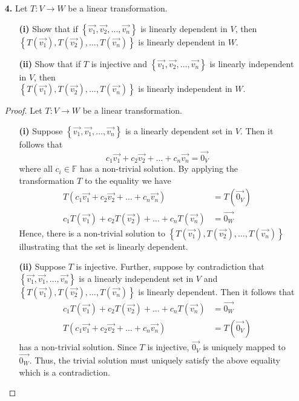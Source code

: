 \documentclass[ 12pt ]{article}
\begin{document}
\begin{enumerate}
	\item[\textbf{4.}] Let $T : V \to W$ be a linear transformation.
		\begin{enumerate}
			\item[\textbf{(i)}] Show that if $\left \{ \vec{v_1}, \vec{v_2}, \hdots, \vec{v_n} \right \}$ is linearly dependent in $V$, then $\left \{ T \left ( \vec{v_1} \right ),
				T \left ( \vec{v_2} \right ), \hdots, T \left ( \vec{v_n} \right ) \right \}$ is linearly dependent in $W$.
			\item[\textbf{(ii)}] Show that if $T$ is injective and $\left \{ \vec{v_1}, \vec{v_2}, \hdots, \vec{v_n} \right \}$ is linearly independent in $V$, then \\
				$\left \{ T \left ( \vec{v_1} \right ), T \left ( \vec{v_2} \right ), \hdots, T \left ( \vec{v_n} \right ) \right \}$ is linearly independent in $W$.
		\end{enumerate}

		\begin{proof}
			Let $T : V \to W$ be a linear transformation.
			\begin{enumerate}
				\item[\textbf{(i)}] Suppose $\left \{ \vec{v_1}, \vec{v_1}, \hdots, \vec{v_n} \right \}$ is a linearly dependent set in $V$. Then it follows that
					$$c_1\vec{v_1} + c_2\vec{v_2} + \hdots + c_n\vec{v_n} = \vec{0_V}$$ where all $c_i \in \mathbb{F}$ has a non-trivial solution. By applying the transformation
					$T$ to the equality we have
					\begin{align*}
						T \left ( c_1\vec{v_1} + c_2\vec{v_2} + \hdots + c_n\vec{v_n} \right ) &= T \left ( \vec{0_V} \right ) \\
						c_1 T \left ( \vec{v_1} \right ) + c_2 T \left ( \vec{v_2} \right ) + \hdots + c_n T \left ( \vec{v_n} \right ) &= \vec{0_W}
					\end{align*}
					Hence, there is a non-trivial solution to $\left \{ T \left ( \vec{v_1} \right ), T \left ( \vec{v_2} \right ), \hdots, T \left ( \vec{v_n} \right )\right \}$
					illustrating that the set is linearly dependent.

				\item[\textbf{(ii)}] Suppose $T$ is injective. Further, suppose by contradiction that $\left \{ \vec{v_1}, \vec{v_1}, \hdots, \vec{v_n} \right \}$ is a linearly
					independent set in $V$ and $\left \{ T \left ( \vec{v_1} \right ), T \left ( \vec{v_2} \right ), \hdots, T \left ( \vec{v_n} \right )\right \}$ is
					linearly dependent. Then it follows that
					\begin{align*}
						c_1 T \left ( \vec{v_1} \right ) + c_2 T \left ( \vec{v_2} \right ) + \hdots + c_n T \left ( \vec{v_n} \right ) &= \vec{0_W} \\
						T \left ( c_1\vec{v_1} + c_2\vec{v_2} + \hdots + c_n\vec{v_n} \right ) &= T \left ( \vec{0_V} \right )
					\end{align*}
					has a non-trivial solution. Since $T$ is injective, $\vec{0_V}$ is uniquely mapped to $\vec{0_W}$. Thus, the trivial solution must uniquely satisfy the above
					equality which is a contradiction.
			\end{enumerate}
		\end{proof}



\end{enumerate}
\end{document}
